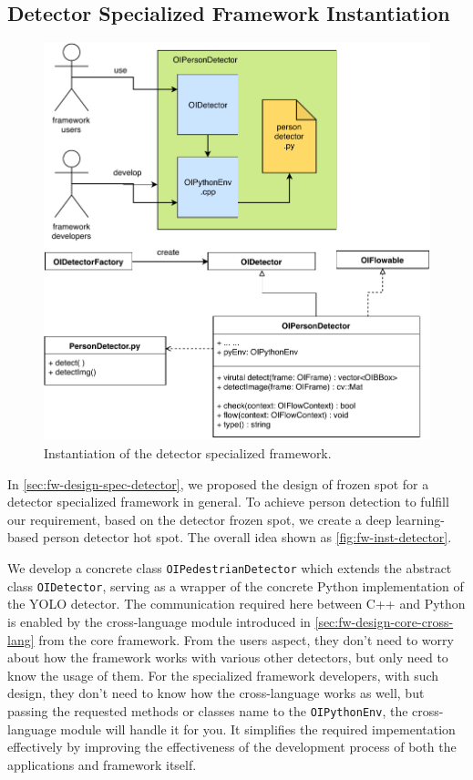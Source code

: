 \subsection{Detector Specialized Framework Instantiation}
\label{sec:fw-inst-detector}

\begin{figure}
    \centering
    \includegraphics[scale=0.8]{figures/framework_inst_detector.pdf}
    \caption{Instantiation of the detector specialized framework.}
    \label{fig:fw-inst-detector}
\end{figure}

In \autoref{sec:fw-design-spec-detector}, we proposed the design of frozen spot
for a detector specialized framework in general. To achieve person
detection to fulfill our requirement, based on the detector frozen spot, we
create a deep learning-based person detector hot spot. The overall idea
shown as \autoref{fig:fw-inst-detector}.

We develop a concrete class \texttt{OIPedestrianDetector} which extends the
abstract class \texttt{OIDetector}, serving as a wrapper of the concrete Python
implementation of the YOLO detector. The communication required here between
C++ and Python is enabled by the cross-language module introduced in
\autoref{sec:fw-design-core-cross-lang} from the core framework.
From the users aspect, they don't need to worry about
how the framework works with various other detectors, but only need to know
the usage of them. For the specialized framework developers, 
with such design, they don't need to know how the cross-language works as well, 
but passing the requested methods or classes name to the \texttt{OIPythonEnv}, 
the cross-language module will handle it for you. It simplifies the required impementation
effectively by improving the effectiveness of the development process of both the applications and
framework itself.

